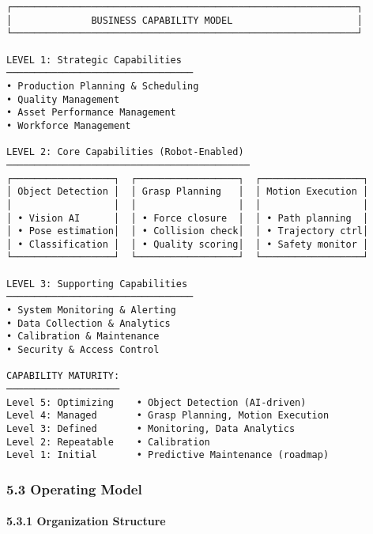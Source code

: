 \documentclass[
]{article}
\begin{document}
\begin{verbatim}
┌─────────────────────────────────────────────────────────────┐
│              BUSINESS CAPABILITY MODEL                      │
└─────────────────────────────────────────────────────────────┘

LEVEL 1: Strategic Capabilities
─────────────────────────────────
• Production Planning & Scheduling
• Quality Management
• Asset Performance Management
• Workforce Management

LEVEL 2: Core Capabilities (Robot-Enabled)
───────────────────────────────────────────
┌──────────────────┐  ┌──────────────────┐  ┌──────────────────┐
│ Object Detection │  │ Grasp Planning   │  │ Motion Execution │
│                  │  │                  │  │                  │
│ • Vision AI      │  │ • Force closure  │  │ • Path planning  │
│ • Pose estimation│  │ • Collision check│  │ • Trajectory ctrl│
│ • Classification │  │ • Quality scoring│  │ • Safety monitor │
└──────────────────┘  └──────────────────┘  └──────────────────┘

LEVEL 3: Supporting Capabilities
─────────────────────────────────
• System Monitoring & Alerting
• Data Collection & Analytics
• Calibration & Maintenance
• Security & Access Control

CAPABILITY MATURITY:
────────────────────
Level 5: Optimizing    • Object Detection (AI-driven)
Level 4: Managed       • Grasp Planning, Motion Execution
Level 3: Defined       • Monitoring, Data Analytics
Level 2: Repeatable    • Calibration
Level 1: Initial       • Predictive Maintenance (roadmap)
\end{verbatim}

\hypertarget{operating-model}{%
\subsubsection{5.3 Operating Model}\label{operating-model}}

\hypertarget{organization-structure}{%
\paragraph{5.3.1 Organization Structure}\label{organization-structure}}
\end{document}
